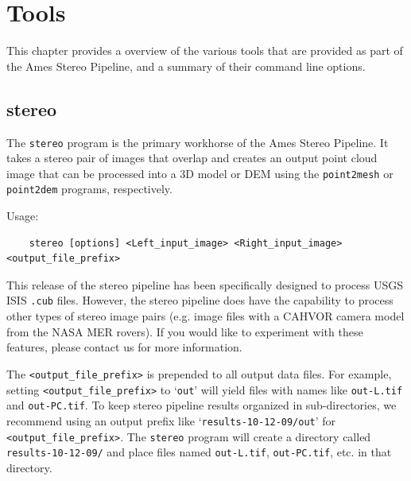\chapter{Tools}

This chapter provides a overview of the various tools that are
provided as part of the Ames Stereo Pipeline, and a summary of their
command line options.


\section{stereo}
\label{stereo}

The \texttt{stereo} program is the primary workhorse of the Ames
Stereo Pipeline.  It takes a stereo pair of images that overlap and
creates an output point cloud image that can be processed into a 3D
model or DEM using the \texttt{point2mesh} or \texttt{point2dem}
programs, respectively.  

\medskip

Usage:
\begin{verbatim}
    stereo [options] <Left_input_image> <Right_input_image> <output_file_prefix>
\end{verbatim}

\medskip

This release of the stereo pipeline has been specifically designed to
process USGS ISIS \texttt{.cub} files.  However, the stereo pipeline
does have the capability to process other types of stereo image pairs
(e.g. image files with a CAHVOR camera model from the NASA MER
rovers).  If you would like to experiment with these features, please
contact us for more information.

The \verb=<output_file_prefix>= is prepended to all output data files.
For example, setting \verb=<output_file_prefix>= to `\verb=out=' will
yield files with names like \verb=out-L.tif= and \verb=out-PC.tif=.
To keep stereo pipeline results organized in sub-directories, we
recommend using an output prefix like `\verb=results-10-12-09/out='
for \verb=<output_file_prefix>=.  The \verb=stereo= program will
create a directory called \verb=results-10-12-09/= and place files
named \verb=out-L.tif=, \verb=out-PC.tif=, etc. in that directory.

